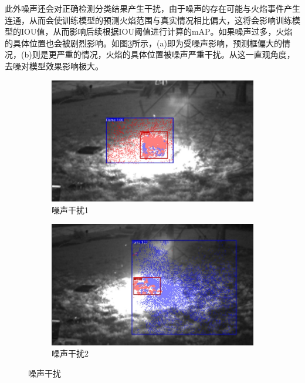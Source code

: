 此外噪声还会对正确检测分类结果产生干扰，由于噪声的存在可能与火焰事件产生连通，从而会使训练模型的预测火焰范围与真实情况相比偏大，这将会影响训练模型的IOU值，从而影响后续根据IOU阈值进行计算的mAP。如果噪声过多，火焰的具体位置也会被剧烈影响。如图\ref{24}所示，(a)即为受噪声影响，预测框偏大的情况，(b)则是更严重的情况，火焰的具体位置被噪声严重干扰。从这一直观角度，去噪对模型效果影响极大。
\begin{figure}[ht]
    \centering
    \begin{subfigure}{0.49\textwidth}
        \centering
        \includegraphics[width=\textwidth]{figures/zaoshen1.png}
        \caption{噪声干扰1}
        \label{24.a}
    \end{subfigure}
    \hfill
    \begin{subfigure}{0.49\textwidth}
        \centering
        \includegraphics[width=\textwidth]{figures/zaosheng2.png}
        \caption{噪声干扰2}
        \label{24.b}
    \end{subfigure}
    \caption{噪声干扰}
    \label{24}
\end{figure}


